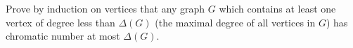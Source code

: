 \documentclass{book}
\begin{document}
\setcounter{project}{46}
\addtocounter{project}{-1}
\begin{activity}[]\label{activity-39}
\hypertarget{p-423}{}%
Prove by induction on vertices that any graph \(G\) which contains at least one vertex of degree less than \(\Delta(G)\) (the maximal degree of all vertices in \(G\)) has chromatic number at most \(\Delta(G)\).%
\end{activity}
\end{document}
